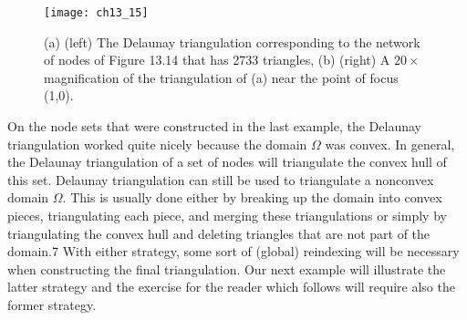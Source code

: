 \documentclass[../main.tex]{subfiles}
\begin{document}
\begin{figure}[H]
	\centering
	\texttt{[image: ch13\_15]}
	\caption{\textsf{(a) (left) The Delaunay triangulation corresponding to the network of nodes of Figure 13.14 that has 2733 triangles, (b) (right) A $20 \times$ magnification of the triangulation of (a) near the point of focus (1,0).}}
	\label{pfig:ch13_15}
\end{figure}

On the node sets that were constructed in the last example, the Delaunay triangulation worked quite nicely because the domain $\Omega$ was convex. In general, the Delaunay triangulation of a set of nodes will triangulate the convex hull of this set. Delaunay triangulation can still be used to triangulate a nonconvex domain $\Omega$. This is usually done either by breaking up the domain into convex pieces, triangulating each piece, and merging these triangulations or simply by triangulating the convex hull and deleting triangles that are not part of the domain.7 With either strategy, some sort of (global) reindexing will be necessary when constructing the final triangulation. Our next example will illustrate the latter strategy and the exercise for the reader which follows will require also the former strategy. 
\end{document}
